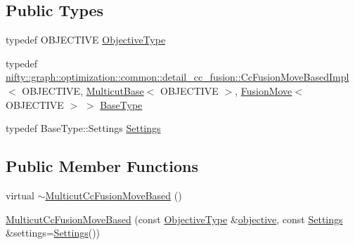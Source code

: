 \subsection*{Public Types}
\begin{DoxyCompactItemize}
\item 
typedef O\+B\+J\+E\+C\+T\+I\+V\+E \hyperlink{classnifty_1_1graph_1_1optimization_1_1multicut_1_1MulticutCcFusionMoveBased_a4e77d22f2925cd6d677347e852b247df}{Objective\+Type}
\item 
typedef \hyperlink{classnifty_1_1graph_1_1optimization_1_1common_1_1detail__cc__fusion_1_1CcFusionMoveBasedImpl}{nifty\+::graph\+::optimization\+::common\+::detail\+\_\+cc\+\_\+fusion\+::\+Cc\+Fusion\+Move\+Based\+Impl}$<$ O\+B\+J\+E\+C\+T\+I\+V\+E, \hyperlink{classnifty_1_1graph_1_1optimization_1_1multicut_1_1MulticutBase}{Multicut\+Base}$<$ O\+B\+J\+E\+C\+T\+I\+V\+E $>$, \hyperlink{classnifty_1_1graph_1_1optimization_1_1multicut_1_1FusionMove}{Fusion\+Move}$<$ O\+B\+J\+E\+C\+T\+I\+V\+E $>$ $>$ \hyperlink{classnifty_1_1graph_1_1optimization_1_1multicut_1_1MulticutCcFusionMoveBased_a02769d7dd373c4203525109810b56b27}{Base\+Type}
\item 
typedef Base\+Type\+::\+Settings \hyperlink{classnifty_1_1graph_1_1optimization_1_1multicut_1_1MulticutCcFusionMoveBased_aed0ee5627ed2e4e9801eec0c5f89b424}{Settings}
\end{DoxyCompactItemize}
\subsection*{Public Member Functions}
\begin{DoxyCompactItemize}
\item 
virtual \hyperlink{classnifty_1_1graph_1_1optimization_1_1multicut_1_1MulticutCcFusionMoveBased_aea0e882aaf4cba0a60468a6d828a33f6}{$\sim$\+Multicut\+Cc\+Fusion\+Move\+Based} ()
\item 
\hyperlink{classnifty_1_1graph_1_1optimization_1_1multicut_1_1MulticutCcFusionMoveBased_a555d3df8bceb5c96da6bb183629fa902}{Multicut\+Cc\+Fusion\+Move\+Based} (const \hyperlink{classnifty_1_1graph_1_1optimization_1_1multicut_1_1MulticutCcFusionMoveBased_a4e77d22f2925cd6d677347e852b247df}{Objective\+Type} \&\hyperlink{classnifty_1_1graph_1_1optimization_1_1common_1_1detail__cc__fusion_1_1CcFusionMoveBasedImpl_ad97005b4bf8bd030c06759e90ca8bbd3}{objective}, const \hyperlink{classnifty_1_1graph_1_1optimization_1_1multicut_1_1MulticutCcFusionMoveBased_aed0ee5627ed2e4e9801eec0c5f89b424}{Settings} \&settings=\hyperlink{classnifty_1_1graph_1_1optimization_1_1multicut_1_1MulticutCcFusionMoveBased_aed0ee5627ed2e4e9801eec0c5f89b424}{Settings}())
\end{DoxyCompactItemize}


